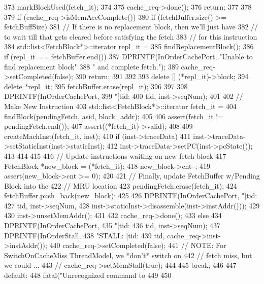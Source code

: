 \begin{DoxyCode}
{{{373             markBlockUsed(fetch_it);
374 
375             cache_req->done();
376             return;
377         }
378 
379         if (cache_req->isMemAccComplete()) {
380             if (fetchBuffer.size() >= fetchBuffSize) {
381                 // If there is no replacement block, then we'll just have
382                 // to wait till that gets cleared before satisfying the fetch
383                 // for this instruction
384                 std::list<FetchBlock*>::iterator repl_it  =
385                     findReplacementBlock();
386                 if (repl_it == fetchBuffer.end()) {
387                     DPRINTF(InOrderCachePort, "Unable to find replacement block"
388                             " and complete fetch.\n");
389                     cache_req->setCompleted(false);
390                     return;
391                 }
392 
393                 delete [] (*repl_it)->block;
394                 delete *repl_it;
395                 fetchBuffer.erase(repl_it);
396             }
397 
398             DPRINTF(InOrderCachePort,
399                     "[tid:%
400                     tid, inst->seqNum);
401 
402             // Make New Instruction
403             std::list<FetchBlock*>::iterator fetch_it  =
404                 findBlock(pendingFetch, asid, block_addr);
405 
406             assert(fetch_it != pendingFetch.end());
407             assert((*fetch_it)->valid);
408 
409             createMachInst(fetch_it, inst);
410             if (inst->traceData) {
411                 inst->traceData->setStaticInst(inst->staticInst);
412                 inst->traceData->setPC(inst->pcState());
413             }
414 
415 
416             // Update instructions waiting on new fetch block
417             FetchBlock *new_block = (*fetch_it);
418             new_block->cnt--;
419             assert(new_block->cnt >= 0);
420 
421             // Finally, update FetchBuffer w/Pending Block into the
422             // MRU location
423             pendingFetch.erase(fetch_it);
424             fetchBuffer.push_back(new_block);
425 
426             DPRINTF(InOrderCachePort, "[tid:%
427                     tid, inst->seqNum,
428                     inst->staticInst->disassemble(inst->instAddr()));
429 
430             inst->unsetMemAddr();
431 
432             cache_req->done();
433         } else {
434             DPRINTF(InOrderCachePort,
435                      "[tid:%
436                     tid, inst->seqNum);
437             DPRINTF(InOrderStall,
438                     "STALL: [tid:%
439                     tid, cache_req->inst->instAddr());
440             cache_req->setCompleted(false);
441             // NOTE: For SwitchOnCacheMiss ThreadModel, we *don't* switch on
442             //       fetch miss, but we could ...
443             // cache_req->setMemStall(true);
444         }
445         break;
446 
447       default:
448         fatal("Unrecognized command to %
449     }
450 }
\end{DoxyCode}
